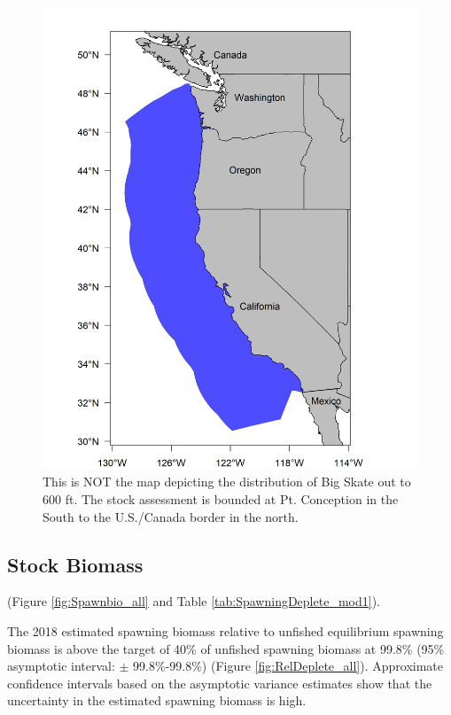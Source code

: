 \documentclass[12pt,]{article}
\begin{document}
\begin{figure}
\centering
\includegraphics{Figures/assess_region_map.png}
\caption{This is NOT the map depicting the distribution of Big Skate out
to 600 ft. The stock assessment is bounded at Pt. Conception in the
South to the U.S./Canada border in the north.
\label{fig:assess_region_map}}
\end{figure}

\FloatBarrier

\hypertarget{stock-biomass}{%
\subsection*{Stock Biomass}\label{stock-biomass}}

(Figure \ref{fig:Spawnbio_all} and Table
\ref{tab:SpawningDeplete_mod1}).

The 2018 estimated spawning biomass relative to unfished equilibrium
spawning biomass is above the target of 40\% of unfished spawning
biomass at 99.8\% (95\% asymptotic interval: \(\pm\) 99.8\%-99.8\%)
(Figure \ref{fig:RelDeplete_all}). Approximate confidence intervals
based on the asymptotic variance estimates show that the uncertainty in
the estimated spawning biomass is high.
\end{document}
